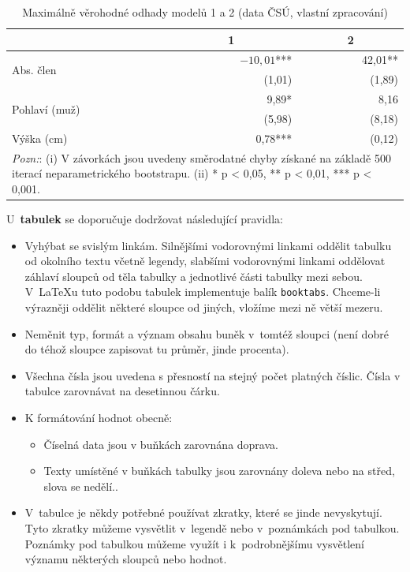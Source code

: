 \begin{table}[htbp!]

\centering

\caption{Maximálně věrohodné odhady modelů 1 a 2 (data ČSÚ, vlastní zpracování)}\label{tab03:Nejaka}
\begin{tabular}{lrr}
\toprule
              & \multicolumn{1}{c}{\textbf{1}} & \multicolumn{1}{c}{\textbf{2}}\\
\midrule
\multirow{2}{*}{Abs. člen}     &$-10,01$***  &42,01**\\
                               & (1,01)      &(1,89)\\
\multirow{2}{*}{Pohlaví (muž)} &	9,89*       & 8,16\\
                               & (5,98)	    &(8,18)\\
Výška (cm)                	   & 0,78***     &(0,12)	\\
\bottomrule
\multicolumn{3}{p{.45\textwidth}}{\footnotesize \textit{Pozn:}: 
(i) V závorkách jsou uvedeny směrodatné chyby získané na základě 500 iterací neparametrického bootstrapu.
(ii) * p < 0,05, ** p < 0,01, *** p < 0,001.}
\end{tabular}
\end{table}

U~\textbf{tabulek} se doporučuje dodržovat následující pravidla:

\begin{itemize} %
\item Vyhýbat se svislým linkám. Silnějšími vodorovnými linkami
  oddělit tabulku od okolního textu včetně legendy, slabšími
  vodorovnými linkami oddělovat záhlaví sloupců od těla tabulky a
  jednotlivé části tabulky mezi sebou. V~\LaTeX u tuto podobu tabulek
  implementuje balík \texttt{booktabs}. Chceme-li výrazněji oddělit
  některé sloupce od jiných, vložíme mezi ně větší mezeru.
\item Neměnit typ, formát a význam obsahu buněk v~tomtéž sloupci
  (není dobré do téhož sloupce zapisovat tu průměr, jinde procenta).
\item Všechna čísla jsou uvedena s přesností na stejný počet platných číslic. Čísla v tabulce zarovnávat na desetinnou čárku.
\item K formátování hodnot obecně:
	\begin{itemize}
  \item Číselná data jsou v buňkách zarovnána doprava. 
  \item Texty umístěné v buňkách tabulky jsou zarovnány doleva nebo na střed, slova se nedělí..
	\end{itemize}
\item V~tabulce je někdy potřebné používat zkratky, které se jinde
nevyskytují. Tyto zkratky můžeme vysvětlit v~legendě nebo
v~poznámkách pod tabulkou. Poznámky pod tabulkou můžeme využít i
k~podrobnějšímu vysvětlení významu  některých sloupců nebo hodnot.
\end{itemize}


